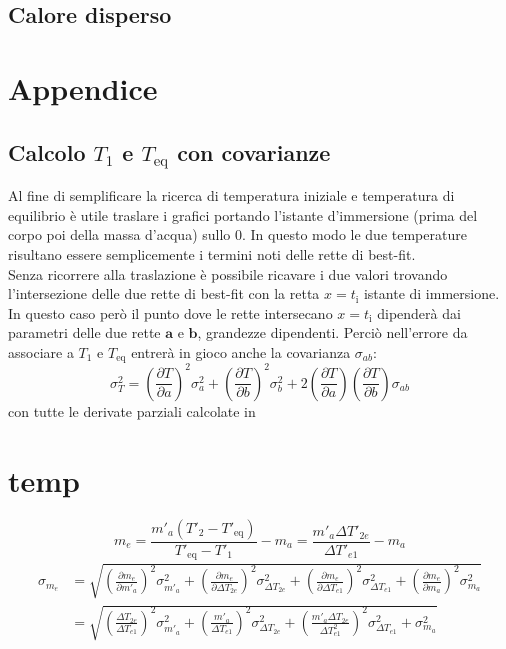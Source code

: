 \documentclass{article}
\begin{document}
	\subsection{Calore disperso}
	
	\newpage
	\section{Appendice}
	\subsection{Calcolo \(T_{1}\) e \(T_{\text{eq}}\) con covarianze} \label{covarianza}
	Al fine di semplificare la ricerca di temperatura iniziale e temperatura di equilibrio è utile traslare i grafici portando l'istante d'immersione (prima del corpo poi della massa d'acqua) sullo \(0\). In questo modo le due temperature risultano essere semplicemente i termini noti delle rette di best-fit. \\
	
	Senza ricorrere alla traslazione è possibile ricavare i due valori trovando l'intersezione delle due rette di best-fit con la retta \(x=t_{\text{i}}\) istante di immersione. In questo caso però il punto dove le rette intersecano \(x=t_{\text{i}}\) dipenderà dai parametri delle due rette  \(\boldsymbol{a}\) e \(\boldsymbol{b}\), grandezze dipendenti. Perciò nell'errore da associare a \(T_{1}\) e \(T_{\text{eq}}\) entrerà in gioco anche la covarianza \(\sigma_{ab}\):
	\[ 
	\sigma_T^2 = \left(\frac{\partial T}{\partial a}\right)^2 \sigma_a^2 + \left(\frac{\partial T}{\partial b}\right)^2 \sigma_b^2 + 2\left(\frac{\partial T}{\partial a}\right)\left(\frac{\partial T}{\partial b}\right) \sigma_{ab}
	\]
	con tutte le derivate parziali calcolate in 
	
	\newpage
	\section{temp}
	\[ 
	m_{e} = \frac{m'_{a}\left(T'_{2} - T'_{\text{eq}}\right)}{T'_{\text{eq}} - T'_{1}} - m_{a} =  \frac{m'_{a}\Delta T'_{2e}}{\Delta T'_{e1}} - m_{a}
	\] \label{sigma me}
	\begin{align*}
		\sigma_{m_e} &= \sqrt{\left(\frac{\partial m_{e}}{\partial m'_{a}}\right)^2\sigma_{m'_{a}}^2 + \left(\frac{\partial m_{e}}{\partial\Delta T_{2e}}\right)^2\sigma_{\Delta T_{2e}}^2 + \left(\frac{\partial m_{e}}{\partial\Delta T_{e1}}\right)^2\sigma_{\Delta T_{e1}}^2 + \left(\frac{\partial m_{e}}{\partial m_{a}}\right)^2\sigma^2_{m_{a}}} \\
					 &= \sqrt{\left(\frac{\Delta T_{2e}}{\Delta T_{e1}}\right)^2\sigma_{m'_{a}}^2 + \left(\frac{m'_{a}}{\Delta T_{e1}}\right)^2\sigma^2_{\Delta T_{2e}} + \left(\frac{m'_{a}\Delta T_{2e}}{\Delta T_{e1}^2}\right)^2\sigma^2_{\Delta T_{e1}}+\sigma^2_{m_{a}}}
	\end{align*}
	\vspace{5cm}
	
\end{document}
